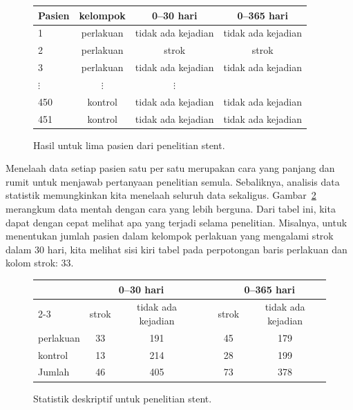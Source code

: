 \begin{figure}[h]
\centering
\begin{tabular}{l ccc}
\hline
Pasien	&	kelompok	&	0--30 hari 	&	0--365 hari \\
\hline
1		&	perlakuan &	tidak ada kejadian &	tidak ada kejadian \\
2		&	perlakuan &	strok & strok \\
3		&	perlakuan &	tidak ada kejadian & tidak ada kejadian \\
$\vdots$	&	$\vdots$	  &	$\vdots$ \\
450	&	kontrol &	tidak ada kejadian &	tidak ada kejadian \\
451	&	kontrol &	tidak ada kejadian &	tidak ada kejadian \\
\hline
\end{tabular}
\caption{Hasil untuk lima pasien dari penelitian stent.}
\label{stentStudyResultsDF}
\end{figure}

Menelaah data setiap pasien satu per satu merupakan cara yang panjang dan rumit untuk menjawab pertanyaan penelitian semula. Sebaliknya, analisis data statistik memungkinkan kita menelaah seluruh data sekaligus. Gambar~\ref{stentStudyResults} merangkum data mentah dengan cara yang lebih berguna. Dari tabel ini, kita dapat dengan cepat melihat apa yang terjadi selama penelitian. Misalnya, untuk menentukan jumlah pasien dalam kelompok perlakuan yang mengalami strok dalam 30 hari, kita melihat sisi kiri tabel pada perpotongan baris perlakuan dan kolom strok: 33.

\begin{figure}[h]
\centering
\begin{tabular}{l cc c cc}
& \multicolumn{2}{c}{0--30 hari} &\hspace{5mm}\ & \multicolumn{2}{c}{0--365 hari} \\
  \cline{2-3} \cline{5-6}
	& 	strok 	& tidak ada kejadian && 	strok 	& tidak ada kejadian \\
  \hline
perlakuan 	& 33		& 191	&&	45 	& 179 \\
kontrol 		& 13		& 214	&& 	28	& 199 \\
  \hline
Jumlah				& 46		& 405	&&	73	& 378 \\
  \hline
\end{tabular}
\caption{Statistik deskriptif untuk penelitian stent.}
\label{stentStudyResults}
\end{figure}

